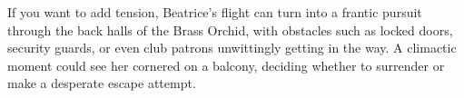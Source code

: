 \begin{WyrdGmTips}  
	If you want to add tension, Beatrice’s flight can turn into a frantic pursuit through the back halls of the Brass Orchid, with obstacles such as locked doors, security guards, or even club patrons unwittingly getting in the way. A climactic moment could see her cornered on a balcony, deciding whether to surrender or make a desperate escape attempt.  
\end{WyrdGmTips}  